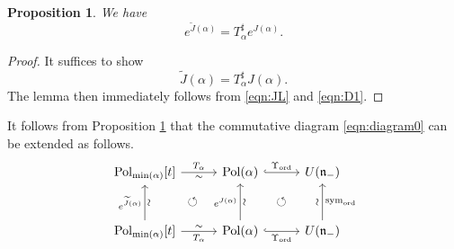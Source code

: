 \documentclass[a4paper,11pt,reqno]{amsart}
\newcommand{\frakn}{\mathfrak{n}}
\newcommand{\0}{{\bf 0}}
\newcommand{\1}{{\bf 1}}
\DeclareMathOperator{\Pol}{Pol}
\newcommand{\ord}{{\mathrm{ord}}}
\newcommand{\wJ}{\widetilde{J}}
\DeclareMathOperator{\sym}{sym}
\theoremstyle{plain}
\newtheorem{proposition}[equation]{Proposition}
\theoremstyle{definition}
\numberwithin{equation}{section}
\theoremstyle{definition}
\begin{document}
\begin{proposition}\label{prop:DD}
We have 
\begin{equation*}
e^{\wJ(\alpha)}=T_\alpha^\sharp e^{J(\alpha)}.
\end{equation*}
\end{proposition}

\begin{proof}
It suffices to show
\begin{equation*}
\wJ(\alpha)=T_\alpha^\sharp J(\alpha).
\end{equation*}
The lemma then immediately follows from \eqref{eqn:JL} and \eqref{eqn:D1}.
\end{proof}

It follows from Proposition \ref{prop:DD} that the commutative diagram \eqref{eqn:diagram0}
can be extended as follows.
\begin{equation}\label{eqn:diagram01}
\begin{tikzcd}[row sep=1cm, column sep=1cm]
\Pol_{\min(\alpha)}[t]
\arrow[r, "T_\alpha", "\sim"']
& 
\Pol(\alpha)
\arrow[dl, pos=0.5, phantom, "\circlearrowleft"]
\arrow[r, "\Upsilon_{\ord}", hook]
& 
U(\frakn_-)
\arrow[dl, pos=0.5, phantom, "\circlearrowleft"]
\\
\Pol_{\min(\alpha)}[t]
\arrow[u, "e^{\wJ(\alpha)}","\sim"' sloped]
\arrow[r,  "\sim", "T_\alpha"']
& 
\Pol(\alpha)
\arrow[u, "e^{J(\alpha)}","\sim"' sloped]
\arrow[r, "\Upsilon_{\ord}"', hook]
& U(\frakn_-)
\arrow[u, "\sim" sloped, "\sym_{\ord}"']
\end{tikzcd}
\end{equation}
\end{document}
